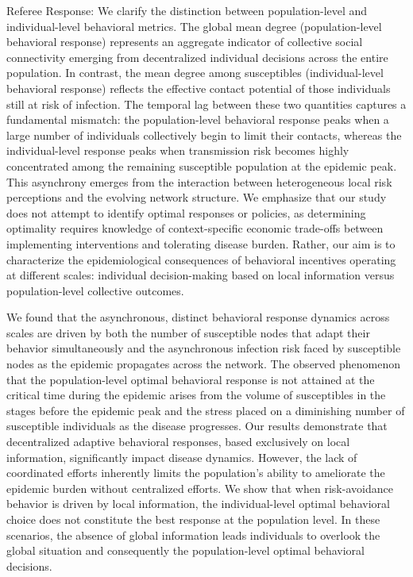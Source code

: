 \documentclass[9pt,twocolumn,twoside]{pnas-new}
\newcommand{\green}[1]{{\textcolor{green!50!black}{#1}}}
\begin{document}
\green{Referee Response: We clarify the distinction between population-level and individual-level behavioral metrics. The global mean degree (population-level behavioral response) represents an aggregate indicator of collective social connectivity emerging from decentralized individual decisions across the entire population. In contrast, the mean degree among susceptibles (individual-level behavioral response) reflects the effective contact potential of those individuals still at risk of infection. The temporal lag between these two quantities captures a fundamental mismatch: the population-level behavioral response peaks when a large number of individuals collectively begin to limit their contacts, whereas the individual-level response peaks when transmission risk becomes highly concentrated among the remaining susceptible population at the epidemic peak. This asynchrony emerges from the interaction between heterogeneous local risk perceptions and the evolving network structure. We emphasize that our study does not attempt to identify optimal responses or policies, as determining optimality requires knowledge of context-specific economic trade-offs between implementing interventions and tolerating disease burden. Rather, our aim is to characterize the epidemiological consequences of behavioral incentives operating at different scales: individual decision-making based on local information versus population-level collective outcomes.}

We found that the asynchronous, distinct behavioral response dynamics across scales are driven by both the number of susceptible nodes that adapt their behavior simultaneously and the asynchronous infection risk faced by susceptible nodes as the epidemic propagates across the network.
The observed phenomenon that the population-level optimal behavioral response is not attained at the critical time during the epidemic arises from the volume of susceptibles in the stages before the epidemic peak and the stress placed on a diminishing number of susceptible individuals as the disease progresses.
%
Our results demonstrate that decentralized adaptive behavioral responses, based exclusively on local information, significantly impact disease dynamics. However, the lack of coordinated efforts inherently limits the population's ability to ameliorate the epidemic burden without centralized efforts.
%
We show that when risk-avoidance behavior is driven by local information, the individual-level optimal behavioral choice does not constitute the best response at the population level. In these scenarios, the absence of global information leads individuals to overlook the global situation and consequently the population-level optimal behavioral decisions.
\end{document}
